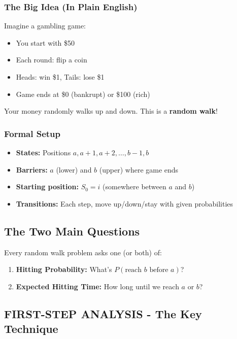 \documentclass[10pt,letterpaper]{article}
\begin{document}
\subsubsection{The Big Idea (In Plain English)}

Imagine a gambling game:
\begin{itemize}
  \item You start with \$50
  \item Each round: flip a coin
  \item Heads: win \$1, Tails: lose \$1
  \item Game ends at \$0 (bankrupt) or \$100 (rich)
\end{itemize}

Your money randomly walks up and down. This is a \textbf{random walk}!

\subsubsection{Formal Setup}

\begin{itemize}
  \item \textbf{States:} Positions $a, a+1, a+2, \ldots, b-1, b$
  \item \textbf{Barriers:} $a$ (lower) and $b$ (upper) where game ends
  \item \textbf{Starting position:} $S_0 = i$ (somewhere between $a$ and $b$)
  \item \textbf{Transitions:} Each step, move up/down/stay with given probabilities
\end{itemize}

\subsection{The Two Main Questions}

Every random walk problem asks one (or both) of:

\begin{enumerate}
  \item \textbf{Hitting Probability:} What's $P(\text{reach } b \text{ before } a)$?
  \item \textbf{Expected Hitting Time:} How long until we reach $a$ or $b$?
\end{enumerate}

\subsection{FIRST-STEP ANALYSIS - The Key Technique}
\end{document}
